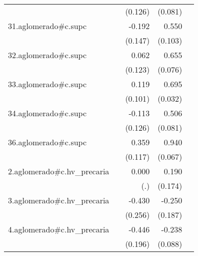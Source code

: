 {\begin{longtable}{l*{4}{D{.}{.}{-1}}}
            &                     &     (0.126)         &     (0.081)         &                     \\
\addlinespace
31.aglomerado#c.supc&                     &      -0.192         &       0.550\sym{***}&                     \\
            &                     &     (0.147)         &     (0.103)         &                     \\
\addlinespace
32.aglomerado#c.supc&                     &       0.062         &       0.655\sym{***}&                     \\
            &                     &     (0.123)         &     (0.076)         &                     \\
\addlinespace
33.aglomerado#c.supc&                     &       0.119         &       0.695\sym{***}&                     \\
            &                     &     (0.101)         &     (0.032)         &                     \\
\addlinespace
34.aglomerado#c.supc&                     &      -0.113         &       0.506\sym{***}&                     \\
            &                     &     (0.126)         &     (0.081)         &                     \\
\addlinespace
36.aglomerado#c.supc&                     &       0.359\sym{**} &       0.940\sym{***}&                     \\
            &                     &     (0.117)         &     (0.067)         &                     \\
\addlinespace
2.aglomerado#c.hv\_precaria&                     &       0.000         &       0.190         &                     \\
            &                     &         (.)         &     (0.174)         &                     \\
\addlinespace
3.aglomerado#c.hv\_precaria&                     &      -0.430         &      -0.250         &                     \\
            &                     &     (0.256)         &     (0.187)         &                     \\
\addlinespace
4.aglomerado#c.hv\_precaria&                     &      -0.446\sym{*}  &      -0.238\sym{**} &                     \\
            &                     &     (0.196)         &     (0.088)         &                     \\

\end{longtable}}
